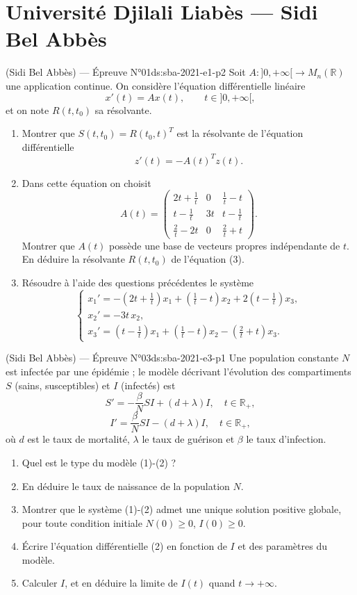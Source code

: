 \newpage
\section{Université Djilali Liabès --- Sidi Bel Abbès}
\begin{problem}{(Sidi Bel Abbès) — Épreuve N°01}{ds:sba-2021-e1-p2}
Soit $A : ]0, +\infty[ \to M_n(\mathbb{R})$ une application continue. On considère l'équation différentielle linéaire
$$
x'(t) = A x(t), \qquad t \in ]0, +\infty[, \tag{3}
$$
et on note $R(t, t_0)$ sa résolvante.
\begin{enumerate}
\item Montrer que $S(t, t_0) = R(t_0, t)^T$ est la résolvante de l'équation différentielle
$$z'(t) = -A(t)^T z(t).$$
\item Dans cette équation on choisit
$$
A(t) = \begin{pmatrix} 2t + \frac{1}{t} & 0 & \frac{1}{t} - t \\ t - \frac{1}{t} & 3t & t - \frac{1}{t} \\ \frac{2}{t} - 2t & 0 & \frac{2}{t} + t \end{pmatrix}.
$$
Montrer que $A(t)$ possède une base de vecteurs propres indépendante de $t$. En déduire la résolvante $R(t, t_0)$ de l'équation (3).
\item Résoudre à l'aide des questions précédentes le système
$$
\begin{cases} x_1' = -(2t + \frac{1}{t}) x_1 + (\frac{1}{t} - t) x_2 + 2(t - \frac{1}{t}) x_3, \\ x_2' = -3t\, x_2, \\ x_3' = (t - \frac{1}{t}) x_1 + (\frac{1}{t} - t) x_2 - (\frac{2}{t} + t) x_3. \end{cases}
$$
\end{enumerate}
\end{problem}
\newpage
\begin{problem}{(Sidi Bel Abbès) — Épreuve N°03}{ds:sba-2021-e3-p1}
Une population constante $N$ est infectée par une épidémie ; le modèle décrivant l'évolution des compartiments $S$ (sains, susceptibles) et $I$ (infectés) est
$$S'=-\frac{\beta}{N}SI+(d+\lambda)I,\quad t\in\mathbb{R}_+,\tag{1}$$
$$I'=\frac{\beta}{N}SI-(d+\lambda)I,\quad t\in\mathbb{R}_+,\tag{2}$$
où $d$ est le taux de mortalité, $\lambda$ le taux de guérison et $\beta$ le taux d'infection.
\begin{enumerate}
\item Quel est le type du modèle (1)-(2) ?
\item En déduire le taux de naissance de la population $N$.
\item Montrer que le système (1)-(2) admet une unique solution positive globale, pour toute condition initiale $N(0)\ge0$, $I(0)\ge0$.
\item Écrire l'équation différentielle (2) en fonction de $I$ et des paramètres du modèle.
\item Calculer $I$, et en déduire la limite de $I(t)$ quand $t\to+\infty$.
\end{enumerate}
\end{problem}
